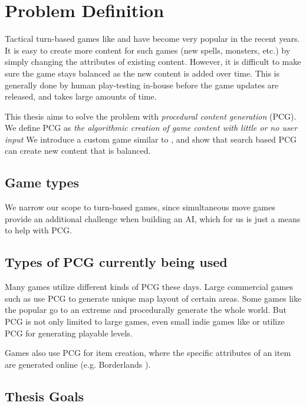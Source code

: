 \chapter{Problem Definition}
\label{chapter01}

Tactical turn-based games like \citet{duelyst} and \citet{faeria} have become
very popular in the recent years. It is easy to create more content for such
games (new spells, monsters, etc.) by simply changing the attributes of
existing content. However, it is difficult to make sure the game stays
balanced as the new content is added over time. This is generally done by human
play-testing  in-house before the game updates are released,
and takes large amounts of time.

This thesis aims to solve the problem with \emph{procedural content generation}
(PCG)\@. We define PCG as \emph{the algorithmic creation of game content with
little or no user input} \citep{pcgbook} We introduce a custom game similar to
\citet{duelyst}, and show that search based PCG can create new content that is
balanced.

\section{Game types}

We narrow our scope to turn-based games, since simultaneous move games provide
an additional challenge when building an AI, which for us is just a means to help
with PCG.

\section{Types of PCG currently being used}

Many games utilize different kinds of PCG these days. Large commercial games
such as \citet{diablo} use PCG to generate unique map layout of certain areas.
Some games like the popular \citet{minecraft} go to an extreme and procedurally
generate the whole world. But PCG is not only limited to large games, even
small indie games like \citet{spelunky} or \citet{terraria} utilize
PCG for generating playable levels.

Games also use PCG for item creation, where the specific attributes of an item
are generated online (e.g. Borderlands \citet{borderlands}).

\section{Thesis Goals}


